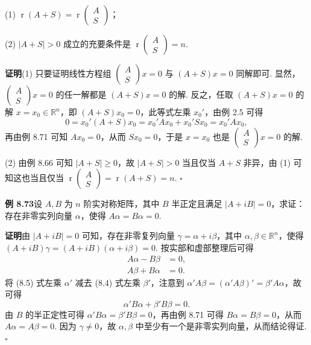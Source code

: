 \documentclass[UTF8,12pt,a4paper,fontset=fandol]{ctexart}
\begin{document}
(1) $\operatorname{r}(A+S)=\operatorname{r}\left(\begin{array}{c}A\\ S\end{array}\right)$；

(2) $|A+S|>0$ 成立的充要条件是 $\operatorname{r}\left(\begin{array}{c}A\\ S\end{array}\right)=n$.

\noindent\textbf{证明}\quad (1) 只要证明线性方程组 $\left(\begin{array}{c}A\\ S\end{array}\right)x=0$ 与 $(A+S)x=0$ 同解即可. 显然，$\left(\begin{array}{c}A\\ S\end{array}\right)x=0$ 的任一解都是 $(A+S)x=0$ 的解. 反之，任取 $(A+S)x=0$ 的解 $x=x_0\in\mathbb{R}^n$，即 $(A+S)x_0=0$，此等式左乘 $x_0'$，由例 2.5 可得
\[
0=x_0'(A+S)x_0=x_0'Ax_0+x_0'Sx_0=x_0'Ax_0,
\]
再由例 8.71 可知 $Ax_0=0$，从而 $Sx_0=0$，于是 $x=x_0$ 也是 $\left(\begin{array}{c}A\\ S\end{array}\right)x=0$ 的解.

(2) 由例 8.66 可知 $|A+S|\ge 0$，故 $|A+S|>0$ 当且仅当 $A+S$ 非异，由 (1) 可知这也当且仅当 $\operatorname{r}\left(\begin{array}{c}A\\ S\end{array}\right)=\operatorname{r}(A+S)=n$. $\ensuremath{\square}$

\noindent\textbf{例 8.73}\quad 设 $A,B$ 为 $n$ 阶实对称矩阵，其中 $B$ 半正定且满足 $|A+iB|=0$，求证：存在非零实列向量 $\alpha$，使得 $A\alpha=B\alpha=0$.

\noindent\textbf{证明}\quad 由 $|A+iB|=0$ 可知，存在非零复列向量 $\gamma=\alpha+i\beta$，其中 $\alpha,\beta\in\mathbb{R}^n$，使得 $(A+iB)\gamma=(A+iB)(\alpha+i\beta)=0$. 按实部和虚部整理后可得
\begin{align}
A\alpha-B\beta&=0,\tag{8.4}\\
A\beta+B\alpha&=0.\tag{8.5}
\end{align}
将 (8.5) 式左乘 $\alpha'$ 减去 (8.4) 式左乘 $\beta'$，注意到 $\alpha'A\beta=(\alpha'A\beta)'=\beta'A\alpha$，故可得
\[
\alpha'B\alpha+\beta'B\beta=0.
\]
由 $B$ 的半正定性可得 $\alpha'B\alpha=\beta'B\beta=0$，再由例 8.71 可得 $B\alpha=B\beta=0$，从而 $A\alpha=A\beta=0$. 因为 $\gamma\ne 0$，故 $\alpha,\beta$ 中至少有一个是非零实列向量，从而结论得证. $\ensuremath{\square}$
\end{document}
